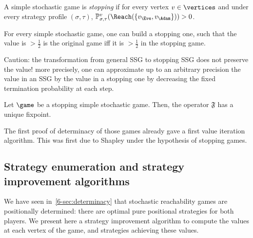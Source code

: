 \begin{definition}
\label{6-def:stopping_simple_stochastic_games}
A simple stochastic game is \emph{stopping} if for every vertex
$v \in \vertices$ and under every  strategy profile
$(\sigma,\tau)$, $\probm_{\sigma,\tau}^v(\Reach(\{v_\Eve,v_\Adam\})) >0$.
\end{definition}


\begin{theorem}
\label{6-thm:reduction_stopping_games}
For every simple stochastic game, one can build a  stopping  one, such that the value is $> \frac{1}{2}$ is the original game iff it is $>\frac{1}{2}$ in the stopping game. 
\end{theorem}

Caution: the transformation from general SSG to stopping
SSG does not preserve the value! more precisely, one can approximate
up to an arbitrary precision the value in an SSG by the value in a
stopping one by decreasing the fixed termination probability at each step.

\begin{proposition}
\label{6-prop:fixed_point_characterisation_stopping_ssg}
Let $\game$ be a stopping simple stochastic game. Then, the operator $\mathfrak{F}$ has a unique fixpoint.
\end{proposition}

The first proof of determinacy of those games already gave a first
value iteration algorithm. This was first due to Shapley under the
hypothesis of stopping games.



\subsection{Strategy enumeration and strategy improvement algorithms}

%


We have seen in~\cref{6-sec:determinacy} that stochastic
reachability games are positionally determined: there are optimal
 pure positional strategies for both players. We present here a
strategy improvement algorithm to compute the values at each vertex of
the game, and strategies achieving these values.

